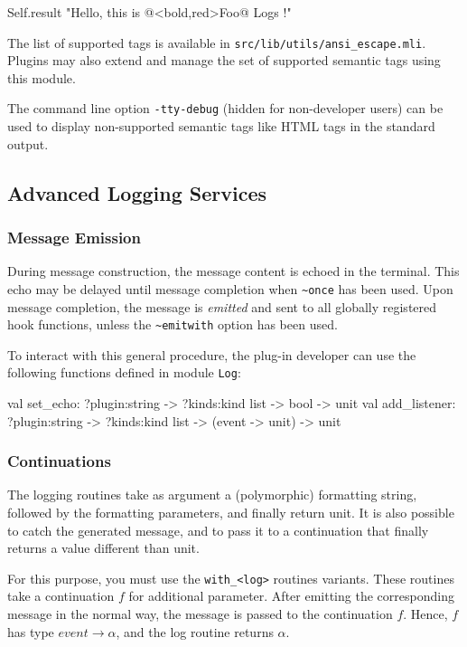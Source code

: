 \begin{ocamlcode}
Self.result "Hello, this is @{<bold,red>Foo@} Logs !"
\end{ocamlcode}

The list of supported tags is available in
\texttt{src/lib/utils/ansi\_escape.mli}.
Plugins may also extend and manage the set of supported semantic tags
using this module.

The command line option \texttt{-tty-debug} (hidden for non-developer users)
can be used to display non-supported semantic tags like HTML tags in the
standard output.

\subsection{Advanced Logging Services}

\subsubsection{Message Emission}
\label{adv:log:events}

During message construction, the message content is echoed in the
terminal. This echo may be delayed until message completion when
\lstinline{~once} has been used. Upon message
completion, the message is \emph{emitted} and sent to all globally
registered hook functions, unless the
\lstinline{~emitwith} option has been used.

To interact with this general procedure, the plug-in developer can use
the following functions defined in module \texttt{Log}:

\begin{ocamlcode}
val set_echo:     ?plugin:string -> ?kinds:kind list -> bool -> unit
val add_listener: ?plugin:string -> ?kinds:kind list -> (event -> unit) -> unit
\end{ocamlcode}

\subsubsection{Continuations}

The logging routines take as argument a (polymorphic) formatting
string, followed by the formatting parameters, and finally return
unit. It is also possible to catch the generated message, and to pass
it to a continuation that finally returns a value different than unit.

For this purpose, you must use the \texttt{with\_<log>} routines
variants. These routines take a continuation $f$ for additional
parameter. After emitting the corresponding message in the normal
way, the message is passed to the continuation $f$. Hence, $f$ has
type $\mathit{event}\rightarrow\alpha$, and the log routine returns
$\alpha$.

